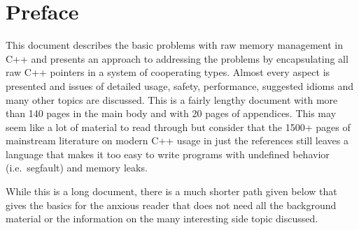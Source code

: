 \documentclass[pdf,ps2pdf,11pt]{SANDreport}
\begin{document}
%
%
%


%
\cleardoublepage   %
\tableofcontents
\listoffigures
\listoftables


\clearpage
\section*{Preface}

This document describes the basic problems with raw memory management
in C++ and presents an approach to addressing the problems by
encapsulating all raw C++ pointers in a system of cooperating types.
Almost every aspect is presented and issues of detailed usage, safety,
performance, suggested idioms and many other topics are discussed.
This is a fairly lengthy document with more than 140 pages in the main
body and with 20 pages of appendices.  This may seem like a lot of
material to read through but consider that the 1500+ pages of
mainstream literature on modern C++ usage in just the references
{}\cite{stroustrup97, C++CodingStandards05, C++Gotchas03,
EffectiveC++ThirdEdition} still leaves a language that makes it too
easy to write programs with undefined behavior (i.e.\ segfault) and
memory leaks.

While this is a long document, there is a much shorter path given
below that gives the basics for the anxious reader that does not need
all the background material or the information on the many interesting
side topic discussed.
\end{document}
